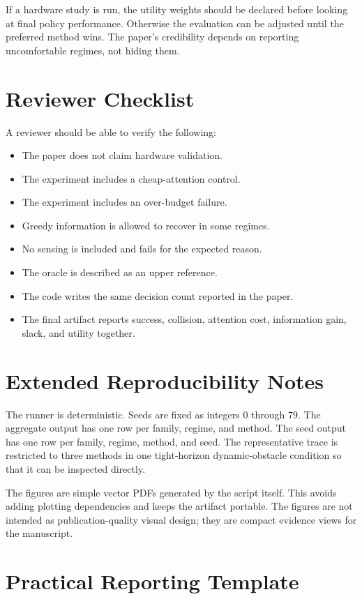 \documentclass{article}
\begin{document}
If a hardware study is run, the utility weights should be declared before
looking at final policy performance. Otherwise the evaluation can be adjusted
until the preferred method wins. The paper's credibility depends on reporting
uncomfortable regimes, not hiding them.

\section{Reviewer Checklist}

A reviewer should be able to verify the following:

\begin{itemize}
    \item The paper does not claim hardware validation.
    \item The experiment includes a cheap-attention control.
    \item The experiment includes an over-budget failure.
    \item Greedy information is allowed to recover in some regimes.
    \item No sensing is included and fails for the expected reason.
    \item The oracle is described as an upper reference.
    \item The code writes the same decision count reported in the paper.
    \item The final artifact reports success, collision, attention cost,
    information gain, slack, and utility together.
\end{itemize}

\section{Extended Reproducibility Notes}

The runner is deterministic. Seeds are fixed as integers 0 through 79. The
aggregate output has one row per family, regime, and method. The seed output
has one row per family, regime, method, and seed. The representative trace is
restricted to three methods in one tight-horizon dynamic-obstacle condition so
that it can be inspected directly.

The figures are simple vector PDFs generated by the script itself. This avoids
adding plotting dependencies and keeps the artifact portable. The figures are
not intended as publication-quality visual design; they are compact evidence
views for the manuscript.

\section{Practical Reporting Template}
\end{document}
